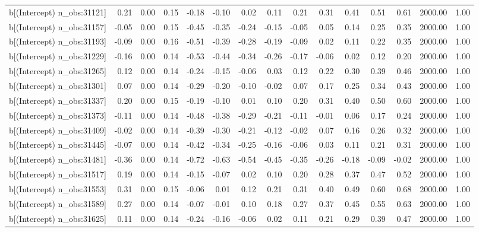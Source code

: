 \begin{table}[ht]
\begin{tabular}{rrrrrrrrrrrrrrr}
  b[(Intercept) n\_obs:31121] & 0.21 & 0.00 & 0.15 & -0.18 & -0.10 & 0.02 & 0.11 & 0.21 & 0.31 & 0.41 & 0.51 & 0.61 & 2000.00 & 1.00 \\ 
  b[(Intercept) n\_obs:31157] & -0.05 & 0.00 & 0.15 & -0.45 & -0.35 & -0.24 & -0.15 & -0.05 & 0.05 & 0.14 & 0.25 & 0.35 & 2000.00 & 1.00 \\ 
  b[(Intercept) n\_obs:31193] & -0.09 & 0.00 & 0.16 & -0.51 & -0.39 & -0.28 & -0.19 & -0.09 & 0.02 & 0.11 & 0.22 & 0.35 & 2000.00 & 1.00 \\ 
  b[(Intercept) n\_obs:31229] & -0.16 & 0.00 & 0.14 & -0.53 & -0.44 & -0.34 & -0.26 & -0.17 & -0.06 & 0.02 & 0.12 & 0.20 & 2000.00 & 1.00 \\ 
  b[(Intercept) n\_obs:31265] & 0.12 & 0.00 & 0.14 & -0.24 & -0.15 & -0.06 & 0.03 & 0.12 & 0.22 & 0.30 & 0.39 & 0.46 & 2000.00 & 1.00 \\ 
  b[(Intercept) n\_obs:31301] & 0.07 & 0.00 & 0.14 & -0.29 & -0.20 & -0.10 & -0.02 & 0.07 & 0.17 & 0.25 & 0.34 & 0.43 & 2000.00 & 1.00 \\ 
  b[(Intercept) n\_obs:31337] & 0.20 & 0.00 & 0.15 & -0.19 & -0.10 & 0.01 & 0.10 & 0.20 & 0.31 & 0.40 & 0.50 & 0.60 & 2000.00 & 1.00 \\ 
  b[(Intercept) n\_obs:31373] & -0.11 & 0.00 & 0.14 & -0.48 & -0.38 & -0.29 & -0.21 & -0.11 & -0.01 & 0.06 & 0.17 & 0.24 & 2000.00 & 1.00 \\ 
  b[(Intercept) n\_obs:31409] & -0.02 & 0.00 & 0.14 & -0.39 & -0.30 & -0.21 & -0.12 & -0.02 & 0.07 & 0.16 & 0.26 & 0.32 & 2000.00 & 1.00 \\ 
  b[(Intercept) n\_obs:31445] & -0.07 & 0.00 & 0.14 & -0.42 & -0.34 & -0.25 & -0.16 & -0.06 & 0.03 & 0.11 & 0.21 & 0.31 & 2000.00 & 1.00 \\ 
  b[(Intercept) n\_obs:31481] & -0.36 & 0.00 & 0.14 & -0.72 & -0.63 & -0.54 & -0.45 & -0.35 & -0.26 & -0.18 & -0.09 & -0.02 & 2000.00 & 1.00 \\ 
  b[(Intercept) n\_obs:31517] & 0.19 & 0.00 & 0.14 & -0.15 & -0.07 & 0.02 & 0.10 & 0.20 & 0.28 & 0.37 & 0.47 & 0.52 & 2000.00 & 1.00 \\ 
  b[(Intercept) n\_obs:31553] & 0.31 & 0.00 & 0.15 & -0.06 & 0.01 & 0.12 & 0.21 & 0.31 & 0.40 & 0.49 & 0.60 & 0.68 & 2000.00 & 1.00 \\ 
  b[(Intercept) n\_obs:31589] & 0.27 & 0.00 & 0.14 & -0.07 & -0.01 & 0.10 & 0.18 & 0.27 & 0.37 & 0.45 & 0.55 & 0.63 & 2000.00 & 1.00 \\ 
  b[(Intercept) n\_obs:31625] & 0.11 & 0.00 & 0.14 & -0.24 & -0.16 & -0.06 & 0.02 & 0.11 & 0.21 & 0.29 & 0.39 & 0.47 & 2000.00 & 1.00 \\ 

\end{tabular}
\end{table}
